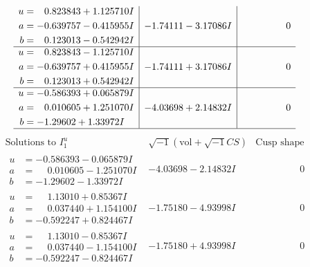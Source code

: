 \documentclass[1p]{elsarticle_modified}
\theoremstyle{definition}
\newcommand{\I}{\sqrt{-1}}
\begin{document}
$$\begin{array}{c|c|c}
\begin{aligned}
u &= \phantom{-}0.823843 + 1.125710 I \\
a &= -0.639757 - 0.415955 I \\
b &= \phantom{-}0.123013 - 0.542942 I\end{aligned}
 & -1.74111 - 3.17086 I & \phantom{-0.000000 } 0 \\ \hline\begin{aligned}
u &= \phantom{-}0.823843 - 1.125710 I \\
a &= -0.639757 + 0.415955 I \\
b &= \phantom{-}0.123013 + 0.542942 I\end{aligned}
 & -1.74111 + 3.17086 I & \phantom{-0.000000 } 0 \\ \hline\begin{aligned}
u &= -0.586393 + 0.065879 I \\
a &= \phantom{-}0.010605 + 1.251070 I \\
b &= -1.29602 + 1.33972 I\end{aligned}
 & -4.03698 + 2.14832 I & \phantom{-0.000000 } 0\\
 \hline 
 \end{array}$$\newpage$$\begin{array}{c|c|c}  
\text{Solutions to }I^u_{1}& \I (\text{vol} + \sqrt{-1}CS) & \text{Cusp shape}\\
 \hline 
\begin{aligned}
u &= -0.586393 - 0.065879 I \\
a &= \phantom{-}0.010605 - 1.251070 I \\
b &= -1.29602 - 1.33972 I\end{aligned}
 & -4.03698 - 2.14832 I & \phantom{-0.000000 } 0 \\ \hline\begin{aligned}
u &= \phantom{-}1.13010 + 0.85367 I \\
a &= \phantom{-}0.037440 + 1.154100 I \\
b &= -0.592247 + 0.824467 I\end{aligned}
 & -1.75180 - 4.93998 I & \phantom{-0.000000 } 0 \\ \hline\begin{aligned}
u &= \phantom{-}1.13010 - 0.85367 I \\
a &= \phantom{-}0.037440 - 1.154100 I \\
b &= -0.592247 - 0.824467 I\end{aligned}
 & -1.75180 + 4.93998 I & \phantom{-0.000000 } 0 \\ \hline\begin{aligned}

\end{aligned}
\end{array}$$
\end{document}

